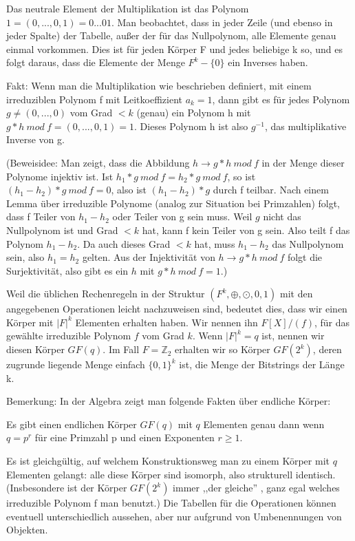 \documentclass[a4paper]{article}
\begin{document}
\begin{multicols}{3}
    Das neutrale Element der Multiplikation ist das Polynom $1=(0,..., 0 ,1) = 0... 01$. Man beobachtet, dass in jeder Zeile (und ebenso in jeder Spalte) der Tabelle, außer der für das Nullpolynom, alle Elemente genau einmal vorkommen. Dies ist für jeden Körper F und jedes beliebige k so, und es folgt daraus, dass die Elemente der Menge $F^k-\{0\}$ ein Inverses haben.

    Fakt: Wenn man die Multiplikation wie beschrieben definiert, mit einem irreduziblen Polynom f mit Leitkoeffizient $a_k=1$, dann gibt es für jedes Polynom $g\not=(0,...,0)$ vom Grad $<k$ (genau) ein Polynom h mit $g*h\ mod\ f=(0,...,0,1)=1$. Dieses Polynom h ist also $g^{-1}$, das multiplikative Inverse von g.

    (Beweisidee: Man zeigt, dass die Abbildung $h\rightarrow g*h\ mod\ f$ in der Menge dieser Polynome injektiv ist. Ist $h_1*g\ mod\ f=h_2*g\ mod\ f$, so ist $(h_1-h_2)*g\ mod\ f= 0$, also ist $(h_1-h_2)*g$ durch f teilbar. Nach einem Lemma über irreduzible Polynome (analog zur Situation bei Primzahlen) folgt, dass f Teiler von $h_1-h_2$ oder Teiler von g sein muss. Weil $g$ nicht das Nullpolynom ist und Grad $<k$ hat, kann f kein Teiler von g sein. Also teilt f das Polynom $h_1-h_2$. Da auch dieses Grad $<k$ hat, muss $h_1-h_2$ das Nullpolynom sein, also $h_1=h_2$ gelten. Aus der Injektivität von $h\rightarrow g*h\ mod\ f$ folgt die Surjektivität, also gibt es ein $h$ mit $g*h\ mod\ f=1$.)

    Weil die üblichen Rechenregeln in der Struktur $(F^k,\oplus,\odot,0,1)$ mit den angegebenen Operationen leicht nachzuweisen sind, bedeutet dies, dass wir einen Körper mit $|F|^k$ Elementen erhalten haben. Wir nennen ihn $F[X]/(f)$, für das gewählte irreduzible Polynom $f$ vom Grad $k$. Wenn $|F|^k=q$ ist, nennen wir diesen Körper $GF(q)$. Im Fall $F=\mathbb{Z}_2$ erhalten wir so Körper $GF(2^k)$, deren zugrunde liegende Menge einfach $\{0,1\}^k$ ist, die Menge der Bitstrings der Länge k.

    Bemerkung: In der Algebra zeigt man folgende Fakten über endliche Körper:
    \begin{itemize*}
        \item Es gibt einen endlichen Körper $GF(q)$ mit $q$ Elementen genau dann wenn $q=p^r$ für eine Primzahl p und einen Exponenten $r\geq 1$.
        \item Es ist gleichgültig, auf welchem Konstruktionsweg man zu einem Körper mit $q$ Elementen gelangt: alle diese Körper sind isomorph, also strukturell identisch. (Insbesondere ist der Körper $GF(2^k)$ immer ,,der gleiche'' , ganz egal welches irreduzible Polynom f man benutzt.) Die Tabellen für die Operationen können eventuell unterschiedlich aussehen, aber nur aufgrund von Umbenennungen von Objekten.
    \end{itemize*}


\end{multicols}
\end{document}
